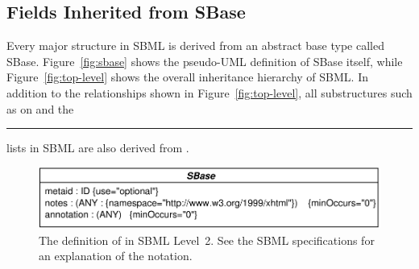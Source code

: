 \documentclass{sbmlmanual}
\begin{document}



\subsection{Fields Inherited from SBase}
\label{sec:inherited-from-sbase}

Every major structure in SBML is derived from an abstract base type called
SBase.  Figure~\vref{fig:sbase} shows the pseudo-UML definition of SBase
itself, while Figure~\vref{fig:top-level} shows the overall inheritance
hierarchy of SBML.  In addition to the relationships shown in
Figure~\ref{fig:top-level}, all substructures such as  on
 and the \rule{0.5in}{0.5pt} lists in SBML are
also derived from .

\begin{figure}[hbt]
  \centering
  \includegraphics[scale = 0.7]{graphics/sbase}
  \caption{The definition of  in SBML Level~2.  See the SBML
    specifications for an explanation of the notation.}
  \label{fig:sbase}
\end{figure}
\end{document}
